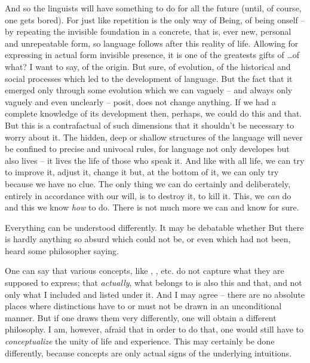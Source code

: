 And so the linguists will have something to do for all the future
(until, of course, one gets bored).  For just like repetition is the
only way of Being, of being onself -- by repeating the invisible
foundation in a concrete, that is, ever new, personal and unrepeatable
form, so language follows after this reality of life.  Allowing for
expressing in actual form invisible presence, it is one of the
greatests gifts of \ldots of what?  I want to say, of the origin.  But
sure, of evolution, of the historical and social processes which led
to the development of language.  But the fact that it emerged only
through some evolution which we can vaguely -- and always only vaguely
and even unclearly -- posit, does not change anything.  If we had a
complete knowledge of its development then, perhaps, we could do this
and that.  But this is a contrafactual  of such dimensions
that it shouldn't be necessary to worry about it.  The hidden, deep or
shallow structures of the language will never be confined to precise
and univocal rules, for language not only developes but also lives --
it lives the life of those who speak it.  And like with all life, we
can try to improve it, adjust it, change it but, at the bottom of it,
we can only try because we have no clue.  The only thing we can do
certainly and deliberately, entirely in accordance with our will, is
to destroy it, to kill it.  This, we {\em can} do and this we know
{\em how} to do.  There is not much more we can and know for sure.



\pa Everything can be understood differently. 
It may be debatable whether  
But there is hardly anything so absurd which could not be, or even which 
had not been, heard some philosopher saying. 

One can say that
various concepts, like , , etc.  do not
capture what they are supposed to express; that {\em actually}, what
belongs to \co{\ldots} is also this and that, and not only what I
included and listed under it.  And I may agree -- there are no absolute
places where distinctions have to or must not be drawn in an
unconditional manner.  But if one draws them very differently, one will
obtain a different philosophy.
I am, however, afraid
that in order to do that, one would still have to 
{\em conceptualize} the unity of life and experience. This may certainly 
be done differently, because concepts are only actual signs of 
the underlying intuitions.


